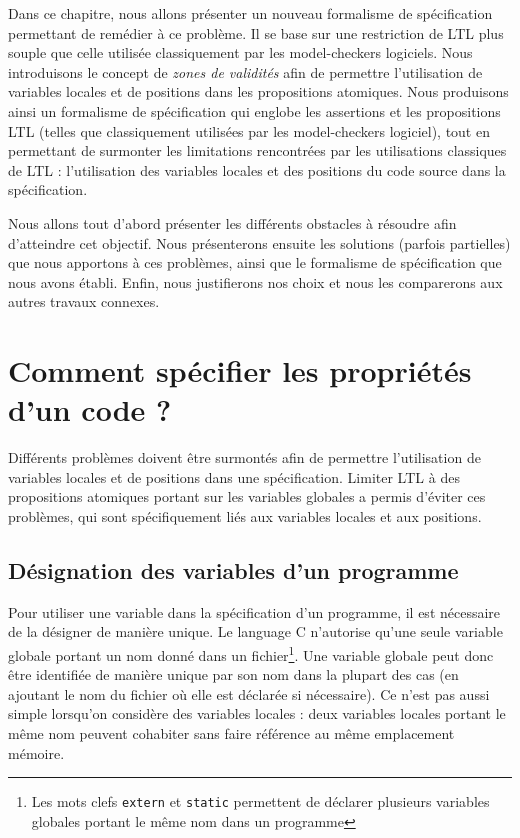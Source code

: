Dans ce chapitre, nous allons présenter un nouveau formalisme de spécification
permettant de remédier à ce problème. Il se base sur une restriction de \ac{LTL}
plus souple que celle utilisée classiquement par les model-checkers logiciels.
Nous introduisons le concept de \emph{zones de validités} afin de permettre
l'utilisation de variables locales et de positions dans les propositions
atomiques. Nous produisons ainsi un formalisme de spécification qui englobe les
assertions et les propositions LTL (telles que classiquement utilisées par les
model-checkers logiciel), tout en permettant de surmonter les limitations
rencontrées par les utilisations classiques de LTL : l'utilisation des variables
locales et des positions du code source dans la spécification.

Nous allons tout d'abord présenter les différents obstacles à résoudre afin
d'atteindre cet objectif. Nous présenterons ensuite les solutions (parfois partielles)
que nous apportons à ces problèmes, ainsi que le formalisme de spécification que
nous avons établi. Enfin, nous justifierons nos choix et nous les comparerons
aux autres travaux connexes.

\section{Comment spécifier les propriétés d'un code ?}

Différents problèmes doivent être surmontés afin de permettre l'utilisation de
variables locales et de positions dans une spécification.
Limiter \ac{LTL} à des propositions atomiques portant sur les variables globales
a permis d'éviter ces problèmes, qui sont spécifiquement liés aux variables
locales et aux positions.

\subsection{Désignation des variables d'un programme}

Pour utiliser une variable dans la spécification d'un programme, il est
nécessaire de la désigner de manière unique.
Le language C n'autorise qu'une seule variable globale portant un nom
donné dans un fichier\footnote{Les mots clefs \texttt{extern} et
\texttt{static} permettent de déclarer plusieurs variables globales
portant le même nom dans un programme}. Une variable globale peut donc être
identifiée de manière unique par son nom dans la plupart des cas (en ajoutant le
nom du fichier où elle est déclarée si nécessaire). Ce n'est pas
aussi simple lorsqu'on considère des variables locales : deux variables
locales portant le même nom peuvent cohabiter sans faire référence au
même emplacement mémoire.

